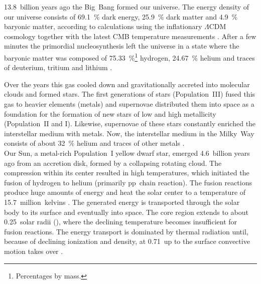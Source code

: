 13.8~billion years ago the Big~Bang formed our universe. The energy density of our universe consists of \SI{69.1}{\percent} dark energy, \SI{25.9}{\percent} dark matter and \SI{4.9}{\percent} baryonic matter, according to calculations using the inflationary $\Lambda$CDM cosmology together with the latest CMB temperature measurements \citep{Planck2016}.
After a few minutes the primordial nucleosynthesis left the universe in a state where the baryonic matter was composed of \SI{75.33}{\percent}\footnote{Percentages by mass.} hydrogen, \SI{24.67}{\percent} helium and traces of deuterium, tritium and lithium \citep{Planck2016}.

Over the years this gas cooled down and gravitationally accreted into molecular clouds and formed stars. The first generations of stars (Population~III) fused this gas to heavier elements (metals) and supernovae distributed them into space as a foundation for the formation of new stars of low and high metallicity (Population~II and I). Likewise, supernovae of these stars constantly enriched the interstellar medium with metals. Now, the interstellar medium in the Milky~Way consists of about \SI{32}{\percent} helium and traces of other metals \citep{Danziger1970}.\\

Our Sun, a metal-rich Population~I yellow dwarf star, emerged 4.6~billion years ago \citep{Bahcall1995} from an accretion disk, formed by a collapsing rotating cloud. The compression within its center resulted in high temperatures, which initiated the fusion of hydrogen to helium (primarily pp~chain reaction). The fusion reactions produce huge amounts of energy and heat the solar center to a temperature of 15.7~million~kelvins \citep{Christensen-Dalsgaard1996}. The generated energy is transported through the solar body to its surface and eventually into space.
The core region extends to about 0.25~solar radii (\Rsun), where the declining temperature becomes insufficient for fusion reactions. The energy transport is dominated by thermal radiation until, because of declining ionization and density, at 0.71\,\Rsun{} up to the surface convective motion takes over \citep{Christensen-Dalsgaard1991}. %

